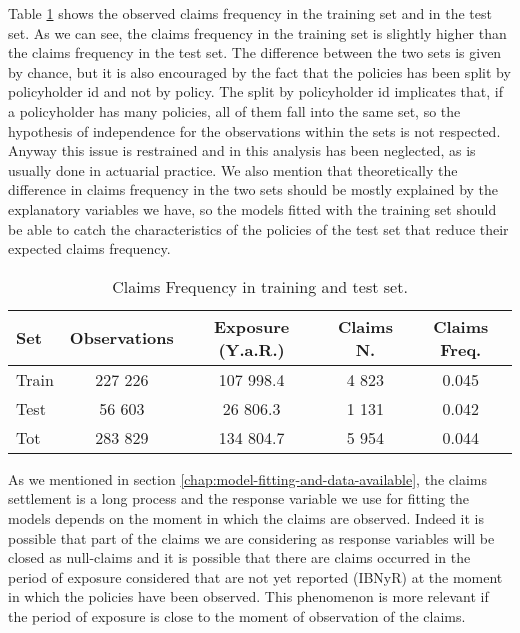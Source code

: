\documentclass[a4paper, twoside, openright, 12pt]{report}
\theoremstyle{definition}
\theoremstyle{definition}
\theoremstyle{definition}
\theoremstyle{remark}
\begin{document}
Table \ref{tab:freq-sin-train-test} shows the observed claims frequency in the training set and in the test set. As we can see, the claims frequency in the training set is slightly higher than the claims frequency in the test set. The difference between the two sets is given by chance, but it is also encouraged by the fact that the policies has been split by policyholder id and not by policy. The split by policyholder id implicates that, if a policyholder has many policies, all of them fall into the same set, so the hypothesis of independence for the observations within the sets is not respected. Anyway this issue is restrained and in this analysis has been neglected, as is usually done in actuarial practice. We also mention that theoretically the difference in claims frequency in the two sets should be mostly explained by the explanatory variables we have, so the models fitted with the training set should be able to catch the characteristics of the policies of the test set that reduce their expected claims frequency.

\begin{table}[!h]

\caption{\label{tab:freq-sin-train-test}Claims Frequency in training and test set.}
\centering
\begin{tabular}[t]{lcccc}
\toprule
\textbf{Set} & \textbf{Observations} & \textbf{Exposure (Y.a.R.)} & \textbf{Claims N.} & \textbf{Claims Freq.}\\
\midrule[\heavyrulewidth]
Train & 227 226 & 107 998.4 & 4 823 & 0.045\\
Test & 56 603 & 26 806.3 & 1 131 & 0.042\\
\midrule
Tot & 283 829 & 134 804.7 & 5 954 & 0.044\\
\bottomrule
\end{tabular}
\end{table}

As we mentioned in section \ref{chap:model-fitting-and-data-available}, the claims settlement is a long process and the response variable we use for fitting the models depends on the moment in which the claims are observed. Indeed it is possible that part of the claims we are considering as response variables will be closed as null-claims and it is possible that there are claims occurred in the period of exposure considered that are not yet reported (IBNyR) at the moment in which the policies have been observed. This phenomenon is more relevant if the period of exposure is close to the moment of observation of the claims.
\end{document}
